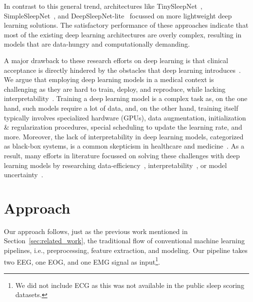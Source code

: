 \documentclass[runningheads]{llncs}
\begin{document}
In contrast to this general trend, architectures like TinySleepNet~\cite{supratak2020tinysleepnet}, SimpleSleepNet~\cite{guillot2020dreem__simplesleepnet}, and DeepSleepNet-lite~\cite{fiorillo2021deepsleepnetlite} focussed on more lightweight deep learning solutions. The satisfactory performance of these approaches indicate that most of the existing deep learning architectures are overly complex, resulting in models that are data-hungry and computationally demanding.

A major drawback to these research efforts on deep learning is that clinical acceptance is directly hindered by the obstacles that deep learning introduces~\cite{fiorillo2019automated}. 
We argue that employing deep learning models in a medical context is challenging as they are hard to train, deploy, and reproduce, while lacking interpretability~\cite{amann2020explainability,fichman2011editorial}. 
Training a deep learning model is a complex task as, on the one hand, such models require a lot of data, and, on the other hand, training itself typically involves specialized hardware (GPUs), data augmentation, initialization \& regularization procedures, special scheduling to update the learning rate, and more.
Moreover, the lack of interpretability in deep learning models, categorized as black-box systems, is a common skepticism in healthcare and medicine~\cite{amann2020explainability}.
As a result, many efforts in literature focussed on solving these challenges with deep learning models by researching data-efficiency~\cite{phan2020towards,phan2021xsleepnet,supratak2020tinysleepnet}, interpretability~\cite{phan2022sleeptransformer,pathak2021stqs}, or model uncertainty~\cite{fiorillo2021deepsleepnetlite}.


\section{Approach}\label{sec:approach}
Our approach follows, just as the previous work mentioned in Section~\ref{sec:related_work}, the traditional flow of conventional machine learning pipelines, i.e., preprocessing, feature extraction, and modeling. 
Our pipeline takes two EEG, one EOG, and one EMG signal as input\footnote{We did not include ECG as this was not available in the public sleep scoring datasets.}.
\end{document}
